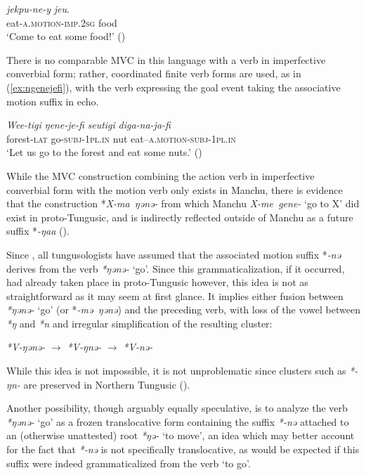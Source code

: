 \documentclass{article}
\newcommand{\ipa}[1]{\textit{{\phon\mbox{#1}}}} %
\begin{document}
\begin{exe}
\ex 
\gll \ipa{jekpu-ne-y} \ipa{jeu}. \\
eat-\textsc{a.motion-imp.2sg} food \\
\glt ‘Come to eat some food!’ (\citealt[122]{nikolaeva01udihe})
\end{exe}

There is no comparable MVC in this language with a verb in imperfective converbial form; rather, coordinated finite verb forms are used, as in (\ref{ex:ngenejefi}), with the verb expressing the goal event taking the associative motion suffix in echo.

\begin{exe}
\ex \label{ex:ngenejefi}
\gll 
\ipa{Wee-tigi} 	\ipa{ŋene-je-fi} 	\ipa{seutigi} 	\ipa{diga-na-ja-fi} \\
forest-\textsc{lat} go-\textsc{subj-1pl.in} nut eat--\textsc{a.motion-subj-1pl.in} \\
\glt ‘Let us go to the forest and eat some nuts.’ (\citealt[121]{nikolaeva01udihe})
\end{exe}

While the MVC construction combining the action verb in imperfective converbial form with the motion verb only exists in Manchu, there is evidence that the construction *\ipa{X-ma ŋənə-} from which Manchu \ipa{X-me gene-} `go to X' did exist in proto-Tungusic, and is indirectly reflected outside of Manchu as a future suffix *\ipa{-ŋaa} (\citealt[40-50, 63-65]{fuente11tungusic}).

Since \citet[209-211]{kotwicz62altaj}, all tungusologists have assumed that the associated motion suffix *\ipa{-nə} derives from the verb \ipa{*ŋənə-} `go'. Since this grammaticalization, if it occurred, had already taken place in proto-Tungusic however, this idea is not as straightforward as it may seem at first glance. It implies either fusion between \ipa{*ŋənə-} `go' (or *\ipa{-mə ŋənə}) and the preceding verb, with loss of the vowel between \ipa{*ŋ} and \ipa{*n} and irregular simplification of the resulting cluster:

\begin{exe}
\ex 
\glt \ipa{*V-ŋənə-} $\rightarrow $ \ipa{*V-ŋnə-} $\rightarrow $  \ipa{*V-nə-} 
\end{exe}  

While this idea is not impossible, it is not unproblematic since clusters such as \ipa{*-ŋn-} are preserved in Northern Tungusic (\citealt[241-4]{cincius49fonetika}). 

Another possibility, though arguably equally speculative, is to analyze the verb \ipa{*ŋənə-} `go' as a frozen translocative form containing the suffix \ipa{*-nə} attached to an (otherwise unattested) root \ipa{*ŋə-} `to move', an idea which may better account for the fact that \ipa{*-nə} is not specifically translocative, as would be expected if this suffix were indeed grammaticalized from the verb `to go'. 
\end{document}
